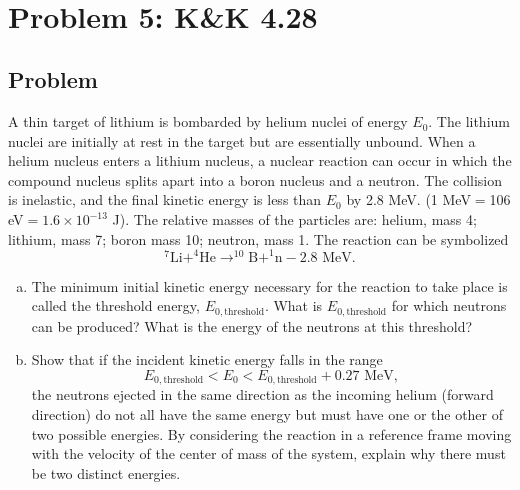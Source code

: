 \documentclass[solutions]{esg8012pset}
\begin{document}
\begin{align*}
  \end{align*}
\section*{Problem 5: K\&K 4.28}
\subsection*{Problem}
  A thin target of lithium is bombarded by helium nuclei of energy $E_0$. The lithium nuclei are initially at rest in the target but are essentially unbound. When a helium nucleus enters a lithium nucleus, a nuclear reaction can occur in which the compound nucleus splits apart into a boron nucleus and a neutron. The collision is inelastic, and the final kinetic energy is less than $E_0$ by 2.8 MeV. (1 MeV$ = $106 eV$ = 1.6 \times 10^{-13}$ J). The relative masses of the particles are: helium, mass 4; lithium, mass 7; boron mass 10; neutron, mass 1. The reaction can be symbolized
$$^7\text{Li} + ^4\text{He} \to ^{10}\text{B} + ^1\text{n} - 2.8\text{ MeV}.$$
  \begin{enumerate}[(a)]
  \item The minimum initial kinetic energy necessary for the reaction to take place is called the threshold energy, $E_{0,\text{threshold}}$. What is $E_{0,\text{threshold}}$ for which neutrons can be produced? What is the energy of the neutrons at this threshold?
    \item Show that if the incident kinetic energy falls in the range $$E_{0,\text{threshold}} < E_0 < E_{0,\text{threshold}} + 0.27\text{ MeV},$$ the neutrons ejected in the same direction as the incoming helium (forward direction) do not all have the same energy but must have one or the other of two possible energies. By considering the reaction in a reference frame moving with the velocity of the center of mass of the system, explain why there must be two distinct energies.
  \end{enumerate}
\end{document}
